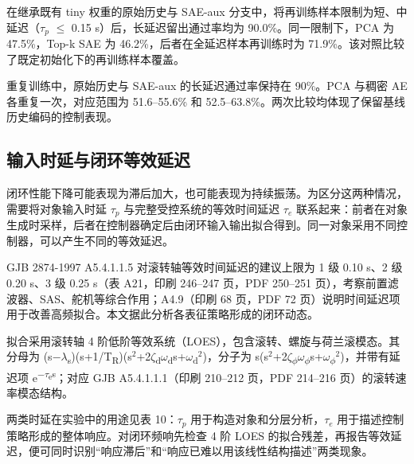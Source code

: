 \documentclass[UTF8,a4paper,11pt,fontset=fandol,scheme=plain]{ctexart}
\begin{document}
在继承既有 tiny 权重的原始历史与 SAE-aux 分支中，将再训练样本限制为短、中延迟（\(\tau_{p}\) \ensuremath{\le} 0.15 s）后，长延迟留出通过率均为 90.0\%。同一限制下，PCA 为 47.5\%，Top-k SAE 为 46.2\%，后者在全延迟样本再训练时为 71.9\%。该对照比较了既定初始化下的再训练样本覆盖。

重复训练中，原始历史与 SAE-aux 的长延迟通过率保持在 90\%。PCA 与稠密 AE 各重复一次，对应范围为 51.6–55.6\% 和 52.5–63.8\%。两次比较均体现了保留基线历史编码的控制表现。

\subsection{输入时延与闭环等效延迟}
\hypertarget{s614}{}\label{s614}
闭环性能下降可能表现为滞后加大，也可能表现为持续振荡。为区分这两种情况，需要将对象输入时延 \(\tau_{p}\) 与完整受控系统的等效时间延迟 \(\tau_{e}\) 联系起来：前者在对象生成时采样，后者在控制器确定后由闭环输入输出拟合得到。同一对象采用不同控制器，可以产生不同的等效延迟。

GJB 2874-1997 A5.4.1.1.5 对滚转轴等效时间延迟的建议上限为 1 级 0.10 s、2 级 0.20 s、3 级 0.25 s（表 A21，印刷 246–247 页，PDF 250–251 页），考察前置滤波器、SAS、舵机等综合作用；A4.9（印刷 68 页，PDF 72 页）说明时间延迟项用于改善高频拟合。本文据此分析各表征策略形成的闭环动态。

拟合采用滚转轴 4 阶低阶等效系统（LOES），包含滚转、螺旋与荷兰滚模态。其分母为 (s\ensuremath{-}\ensuremath{\lambda}\textsubscript{s})(s+1/T\textsubscript{R})(s\ensuremath{{}^2}+2\ensuremath{\zeta}\textsubscript{d}\ensuremath{\omega}\textsubscript{d}s+\ensuremath{\omega}\textsubscript{d}\ensuremath{{}^2})，分子为 s(s\ensuremath{{}^2}+2\ensuremath{\zeta}\textsubscript{\ensuremath{\phi}}\ensuremath{\omega}\textsubscript{\ensuremath{\phi}}s+\ensuremath{\omega}\textsubscript{\ensuremath{\phi}}\ensuremath{{}^2})，并带有延迟项 e\textsuperscript{\ensuremath{-}\ensuremath{\tau}\textsubscript{e}s}；对应 GJB A5.4.1.1.1（印刷 210–212 页，PDF 214–216 页）的滚转速率模态结构。

两类时延在实验中的用途见表 10：\(\tau_{p}\) 用于构造对象和分层分析，\(\tau_{e}\) 用于描述控制策略形成的整体响应。对闭环频响先检查 4 阶 LOES 的拟合残差，再报告等效延迟，便可同时识别“响应滞后”和“响应已难以用该线性结构描述”两类现象。
\end{document}
